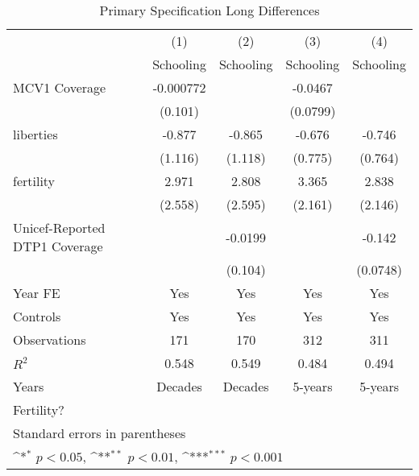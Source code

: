 \begin{table}[htbp]\centering
\def\sym#1{\ifmmode^{#1}\else\(^{#1}\)\fi}
\caption{Primary Specification Long Differences}
\begin{tabular}{l*{4}{c}}
\toprule
                &\multicolumn{1}{c}{(1)}&\multicolumn{1}{c}{(2)}&\multicolumn{1}{c}{(3)}&\multicolumn{1}{c}{(4)}\\
                &\multicolumn{1}{c}{Schooling}&\multicolumn{1}{c}{Schooling}&\multicolumn{1}{c}{Schooling}&\multicolumn{1}{c}{Schooling}\\
\midrule
MCV1 Coverage   &-0.000772         &                  &  -0.0467         &                  \\
                &  (0.101)         &                  & (0.0799)         &                  \\
\addlinespace
liberties       &   -0.877         &   -0.865         &   -0.676         &   -0.746         \\
                &  (1.116)         &  (1.118)         &  (0.775)         &  (0.764)         \\
\addlinespace
fertility       &    2.971         &    2.808         &    3.365         &    2.838         \\
                &  (2.558)         &  (2.595)         &  (2.161)         &  (2.146)         \\
\addlinespace
Unicef-Reported DTP1 Coverage&                  &  -0.0199         &                  &   -0.142         \\
                &                  &  (0.104)         &                  & (0.0748)         \\
\addlinespace
Year FE         &      Yes         &      Yes         &      Yes         &      Yes         \\
\addlinespace
Controls        &      Yes         &      Yes         &      Yes         &      Yes         \\
\midrule
Observations    &      171         &      170         &      312         &      311         \\
\(R^{2}\)       &    0.548         &    0.549         &    0.484         &    0.494         \\
Years           &  Decades         &  Decades         &  5-years         &  5-years         \\
Fertility?      &                  &                  &                  &                  \\
\bottomrule
\multicolumn{5}{l}{\footnotesize Standard errors in parentheses}\\
\multicolumn{5}{l}{\footnotesize \sym{*} \(p<0.05\), \sym{**} \(p<0.01\), \sym{***} \(p<0.001\)}\\
\end{tabular}
\end{table}
